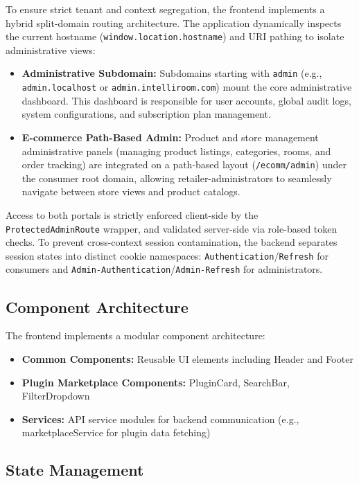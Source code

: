 To ensure strict tenant and context segregation, the frontend implements a hybrid split-domain routing architecture. The application dynamically inspects the current hostname (\texttt{window.location.hostname}) and URI pathing to isolate administrative views:
\begin{itemize}
    \item \textbf{Administrative Subdomain:} Subdomains starting with \texttt{admin} (e.g., \texttt{admin.localhost} or \texttt{admin.intelliroom.com}) mount the core administrative dashboard. This dashboard is responsible for user accounts, global audit logs, system configurations, and subscription plan management.
    \item \textbf{E-commerce Path-Based Admin:} Product and store management administrative panels (managing product listings, categories, rooms, and order tracking) are integrated on a path-based layout (\texttt{/ecomm/admin}) under the consumer root domain, allowing retailer-administrators to seamlessly navigate between store views and product catalogs.
\end{itemize}
Access to both portals is strictly enforced client-side by the \texttt{ProtectedAdminRoute} wrapper, and validated server-side via role-based token checks. To prevent cross-context session contamination, the backend separates session states into distinct cookie namespaces: \texttt{Authentication}/\texttt{Refresh} for consumers and \texttt{Admin-Authentication}/\texttt{Admin-Refresh} for administrators.

\subsection{Component Architecture}

The frontend implements a modular component architecture:

\begin{itemize}
    \item \textbf{Common Components:} Reusable UI elements including Header and Footer
    \item \textbf{Plugin Marketplace Components:} PluginCard, SearchBar, FilterDropdown
    \item \textbf{Services:} API service modules for backend communication (e.g., marketplaceService for plugin data fetching)
\end{itemize}

\subsection{State Management}

